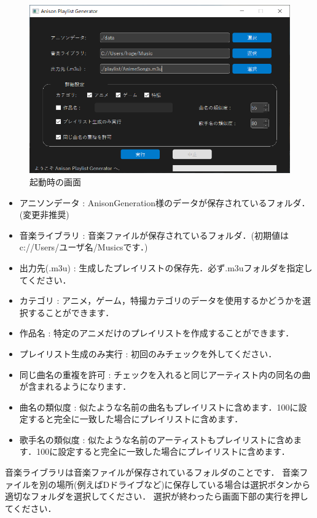 \documentclass[10pt]{ujarticle}
\begin{document}
\begin{figure}[tbh]
    \centering
    \includegraphics[width=0.95\hsize]{./figs/apg_ui.png}
    \caption{起動時の画面}
    \label{fig:apg_ui}
\end{figure}

\begin{itemize}
    \item アニソンデータ : AnisonGeneration様のデータが保存されているフォルダ．(変更非推奨)
    \item 音楽ライブラリ : 音楽ファイルが保存されているフォルダ．(初期値はc://Users/ユーザ名/Musicsです．)
    \item 出力先(.m3u) : 生成したプレイリストの保存先．必ず.m3uフォルダを指定してください．
    \item カテゴリ : アニメ，ゲーム，特撮カテゴリのデータを使用するかどうかを選択することができます．
    \item 作品名 : 特定のアニメだけのプレイリストを作成することができます．
    \item プレイリスト生成のみ実行 : 初回のみチェックを外してください．
    \item 同じ曲名の重複を許可 : チェックを入れると同じアーティスト内の同名の曲が含まれるようになります．
    \item 曲名の類似度 : 似たような名前の曲名もプレイリストに含めます．100に設定すると完全に一致した場合にプレイリストに含めます．
    \item 歌手名の類似度 : 似たような名前のアーティストもプレイリストに含めます．100に設定すると完全に一致した場合にプレイリストに含めます．
\end{itemize}

音楽ライブラリは音楽ファイルが保存されているフォルダのことです．
音楽ファイルを別の場所(例えばDドライブなど)に保存している場合は選択ボタンから適切なフォルダを選択してください．
選択が終わったら画面下部の実行を押してください．
\end{document}
